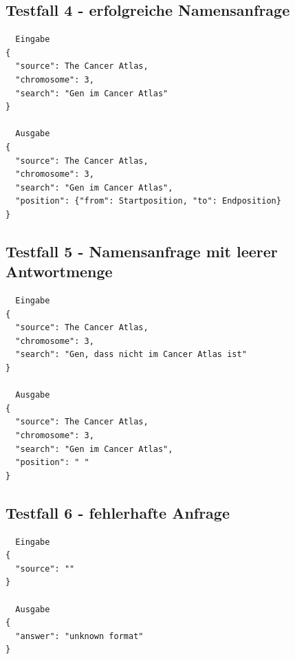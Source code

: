 \documentclass[a4paper,12pt]{scrartcl}
\begin{document}
\subsection{Testfall 4 - erfolgreiche Namensanfrage}
\begin{verbatim}
  Eingabe
{
  "source": The Cancer Atlas,
  "chromosome": 3,
  "search": "Gen im Cancer Atlas"
}

  Ausgabe
{
  "source": The Cancer Atlas,
  "chromosome": 3,
  "search": "Gen im Cancer Atlas",
  "position": {"from": Startposition, "to": Endposition}
}
\end{verbatim}

\subsection{Testfall 5 - Namensanfrage mit leerer Antwortmenge}
\begin{verbatim}
  Eingabe
{
  "source": The Cancer Atlas,
  "chromosome": 3,
  "search": "Gen, dass nicht im Cancer Atlas ist"
}

  Ausgabe
{
  "source": The Cancer Atlas,
  "chromosome": 3,
  "search": "Gen im Cancer Atlas",
  "position": " "
}
\end{verbatim}

\subsection{Testfall 6 - fehlerhafte Anfrage}
\begin{verbatim}
  Eingabe
{
  "source": ""
}

  Ausgabe
{
  "answer": "unknown format"
}
\end{verbatim}
\end{document}
